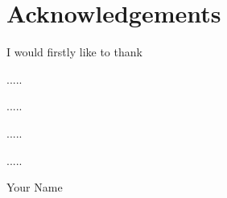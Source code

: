 


\makenoidxglossaries




\setcounter{secnumdepth}{0}

\section{Acknowledgements}
I would firstly like to thank 

\vspace{1em}
.....

\vspace{1em}
.....

\vspace{1em}
.....

\vspace{1em}

.....
\vspace{2em}

Your Name

\newpage
\tableofcontents
\newpage
\listoffigures
\newpage
\listoftables
\newpage
\begin{singlespacing}
\renewcommand{\glsnamefont}[1]{\textbf{#1}}
\printnoidxglossary[type=\acronymtype,style=long]
\end{singlespacing}
\newpage

\newpage
{} %

\newpage
{}
\setcounter{secnumdepth}{4} %
\fancyhead[L]{\fancyplain{}\slshape{\rightmark}}        %

\newpage

\newpage

\newpage

\newpage



\newpage
\fancyhead[L]{}         %
\renewcommand\thefigure{\thesection.\arabic{figure}}
\renewcommand\thetable{\thesection.\arabic{table}}  
\setcounter{figure}{0} 
\setcounter{table}{0} 
\appendixtitleon
\appendixtitletocon %


